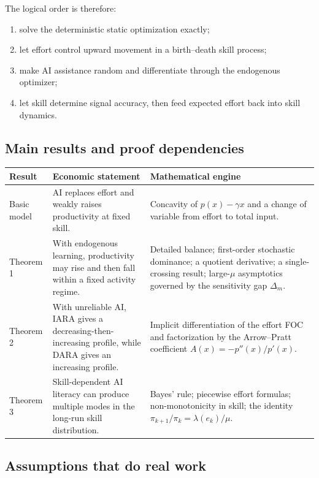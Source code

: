 \documentclass[11pt]{article}
\theoremstyle{tutorial}
\theoremstyle{remark}
\newcommand{\1}{\mathbb{I}}
\begin{document}
The logical order is therefore:
\begin{enumerate}
  \item solve the deterministic static optimization exactly;
  \item let effort control upward movement in a birth--death skill process;
  \item make AI assistance random and differentiate through the endogenous optimizer;
  \item let skill determine signal accuracy, then feed expected effort back into skill dynamics.
\end{enumerate}

\subsection{Main results and proof dependencies}

\begin{longtable}{p{}p{}p{}}
\toprule
Result & Economic statement & Mathematical engine\\
\midrule
\endhead
Basic model & AI replaces effort and weakly raises productivity at fixed skill. & Concavity of
$p(x)-\gamma x$ and a change of variable from effort to total input.\\
Theorem 1 & With endogenous learning, productivity may rise and then fall within a fixed activity regime. &
Detailed balance; first-order stochastic dominance; a quotient derivative; a single-crossing result;
large-$\mu$ asymptotics governed by the sensitivity gap $\Delta_m$.\\
Theorem 2 & With unreliable AI, IARA gives a decreasing-then-increasing profile, while DARA gives an increasing profile. &
Implicit differentiation of the effort FOC and factorization by the Arrow--Pratt coefficient
$A(x)=-p''(x)/p'(x)$.\\
Theorem 3 & Skill-dependent AI literacy can produce multiple modes in the long-run skill distribution. &
Bayes' rule; piecewise effort formulas; non-monotonicity in skill; the identity
$\pi_{k+1}/\pi_k=\lambda(e_k)/\mu$.\\
\bottomrule
\end{longtable}

\subsection{Assumptions that do real work}
\end{document}
